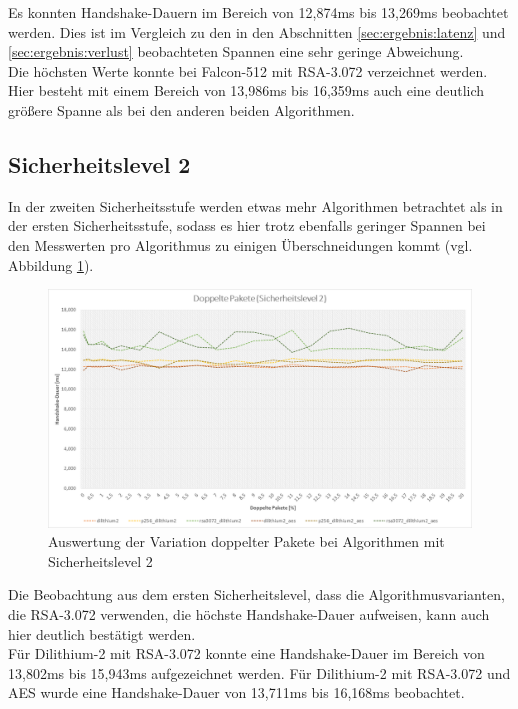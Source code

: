 		Es konnten Handshake-Dauern im Bereich von 12,874ms bis 13,269ms beobachtet werden. Dies ist im Vergleich zu den in den 				Abschnitten \ref{sec:ergebnis:latenz} und \ref{sec:ergebnis:verlust} beobachteten Spannen eine sehr geringe Abweichung.\\
		
		Die höchsten Werte konnte bei Falcon-512 mit RSA-3.072 verzeichnet werden. Hier besteht mit einem Bereich von 13,986ms bis 16,359ms auch eine 					deutlich größere Spanne als bei den anderen beiden Algorithmen.
		
		\subsection{Sicherheitslevel 2}
		\label{subsec:ergebnis:doppelt:sl2}
		
		In der zweiten Sicherheitsstufe werden etwas mehr Algorithmen betrachtet als in der ersten Sicherheitsstufe, sodass es hier trotz ebenfalls geringer 		Spannen bei den Messwerten pro Algorithmus zu einigen Überschneidungen kommt (vgl. Abbildung \ref{fig:ergebnis:doppelt:sl2}).
		
		\begin{figure}[htbp]
			\centering
			\includegraphics[width=\textwidth]{../auswertung/doppelt_sl2.png}
			\caption{Auswertung der Variation doppelter Pakete bei Algorithmen mit Sicherheitslevel 2}
			\label{fig:ergebnis:doppelt:sl2}
		\end{figure}
		
		Die Beobachtung aus dem ersten Sicherheitslevel, dass die Algorithmusvarianten, die RSA-3.072 verwenden, die höchste Handshake-Dauer aufweisen, kann auch hier deutlich bestätigt werden.\\
		
		Für Dilithium-2 mit RSA-3.072 konnte eine Handshake-Dauer im Bereich von 13,802ms bis 15,943ms aufgezeichnet werden. Für Dilithium-2 mit RSA-3.072 und AES wurde eine Handshake-Dauer von 13,711ms bis 16,168ms beobachtet.\\
		
